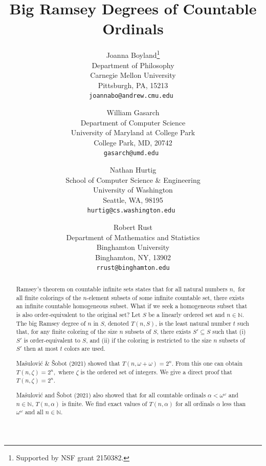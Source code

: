\documentclass[11pt]{article}
\title{Big Ramsey Degrees of Countable Ordinals}
\author{Joanna Boyland\thanks{Supported by NSF grant 2150382.}\\
\small Department of Philosophy\\[-0.8ex]
\small Carnegie Mellon University \\[-0.8ex] 
\small Pittsburgh, PA, 15213 \\
\small\tt joannabo@andrew.cmu.edu
\and
William Gasarch\footnotemark[1]\\
\small Department of Computer Science\\[-0.8ex]
\small University of Maryland at College Park\\[-0.8ex]
\small College Park, MD, 20742\\
\small\tt gasarch@umd.edu
\and
Nathan Hurtig\footnotemark[1]\\
\small School of Computer Science \& Engineering\\[-0.8ex]
\small University of Washington\\[-0.8ex]
\small Seattle, WA, 98195\\
\small\tt hurtig@cs.washington.edu
\and
Robert Rust\footnotemark[1]\\
\small Department of Mathematics and Statistics\\[-0.8ex]
\small Binghamton University\\[-0.8ex]
\small Binghamton, NY, 13902\\
\small\tt rrust@binghamton.edu}
\newcommand{\om}{\omega}
\newcommand{\N}{\mathbb{N}}
\newcommand{\numpoints}{n}
\theoremstyle{plain}
\theoremstyle{definition}
\begin{document}
\maketitle

\begin{abstract}


Ramsey's theorem on countable infinite sets states that for all natural numbers $n,$ for all finite colorings of the $n$-element subsets of some infinite countable set, there exists an infinite countable homogeneous subset. What if we seek a homogeneous subset that is also order-equivalent to the original set?
Let $S$ be a linearly ordered set and $\numpoints \in\N$.  
The big Ramsey degree of $\numpoints$ in $S$, denoted $T(\numpoints,S)$,  is the least natural number $t$ such that, for any finite coloring of the size $\numpoints$ subsets of $S$, there exists $S'\subseteq S$ such that (i) $S'$ is order-equivalent to $S$, and (ii) if the coloring is restricted to the size $\numpoints$ subsets of $S'$ then at most $t$ colors are used. 

Ma\v{s}ulovi\'{c} \& \v{S}obot (2021) showed that
$T(\numpoints,\omega+\omega)=2^{\numpoints}$. From this one can obtain $T(\numpoints,\zeta)=2^{\numpoints},$ where
$\zeta$ is the ordered set of integers.
We give a direct proof that $T(\numpoints,\zeta)=2^{\numpoints}$. 

Ma\v{s}ulovi\'{c} and \v{S}obot (2021) also showed that for all
countable ordinals $\alpha < \om^\om$ and $\numpoints \in \N$, $T(\numpoints,\alpha)$  is finite. 
We find exact values of $T(\numpoints,\alpha)$ for all ordinals $\alpha$ less than $\om^\om$ and all $\numpoints \in\N$.

\end{abstract}
\end{document}
